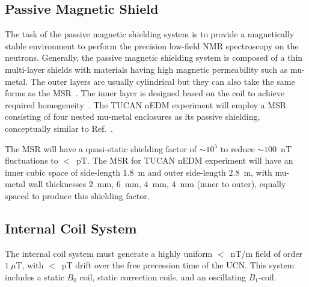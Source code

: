 
\subsection{Passive Magnetic Shield}\label{sec:passive}
The task of the passive magnetic shielding system is to provide a magnetically stable environment to perform the precision low-field NMR spectroscopy on the neutrons. Generally, the passive magnetic shielding system is composed of a thin multi-layer shields with materials having high magnetic permeability such as mu-metal. The outer layers are usually cylindrical \cite{mu_cyl_1,mu_cyl_2} but they can also take the same forms as the MSR~\cite{mu_msr_1,mu_msr_2}. The inner layer is designed based on the coil to achieve required homogeneity~\cite{mu_inner_1,mu_inner_2}. The TUCAN nEDM experiment will employ a MSR consisting of four nested mu-metal enclosures as its passive shielding, conceptually similar to Ref.~\cite{msr_design}.  


The MSR will have a quasi-static shielding factor of $\sim\mathrm{10^{5}}$ to reduce $\sim100$~nT fluctuations to $<$~pT. The MSR for TUCAN nEDM experiment will have an inner cubic space of side-length $1.8$~m and outer side-length $2.8$~m, with mu-metal wall thicknesses $2$~mm, $6$~mm, $4$~mm, $4$~mm (inner to outer), equally spaced to produce this shielding factor. 


\subsection{Internal Coil System}

The internal coil system must generate a highly uniform $<$~nT/m field of order $1~\mu$T, with $<$~pT drift over the free precession time of the UCN. This system includes a static $B_0$ coil, static correction coils, and an oscillating $B_1$-coil.



